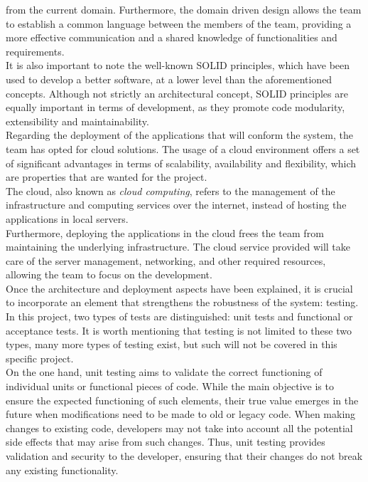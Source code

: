 \documentclass[../memory.tex]{subfiles}
\begin{document}
from the current domain. Furthermore, the domain driven design allows the team
to establish a common language between the members of the team, providing a more
effective communication and a shared knowledge of functionalities and
requirements.
\\
It is also important to note the well-known SOLID principles, which have been
used to develop a better software, at a lower level than the aforementioned
concepts. Although not strictly an architectural concept, SOLID principles are
equally important in terms of development, as they promote code modularity,
extensibility and maintainability.
\\[8pt]
Regarding the deployment of the applications that will conform the system, the
team has opted for cloud solutions. The usage of a cloud environment offers a
set of significant advantages in terms of scalability, availability and
flexibility, which are properties that are wanted for the project.
\\
The cloud, also known as \emph{cloud computing}, refers to the management of the
infrastructure and computing services over the internet, instead of hosting the
applications in local servers.
\\
Furthermore, deploying the applications in the cloud frees the team from
maintaining the underlying infrastructure. The cloud service provided will take
care of the server management, networking, and other required resources,
allowing the team to focus on the development.
\\[8pt]
Once the architecture and deployment aspects have been explained, it is crucial
to incorporate an element that strengthens the robustness of the system:
testing. In this project, two types of tests are distinguished: unit tests and
functional or acceptance tests. It is worth mentioning that testing is not
limited to these two types, many more types of testing exist, but such will not
be covered in this specific project.
\\
On the one hand, unit testing aims to validate the correct functioning of
individual units or functional pieces of code. While the main objective is to
ensure the expected functioning of such elements, their true value emerges in
the future when modifications need to be made to old or legacy code. When making
changes to existing code, developers may not take into account all the potential
side effects that may arise from such changes. Thus, unit testing provides
validation and security to the developer, ensuring that their changes do not
break any existing functionality.
\end{document}
